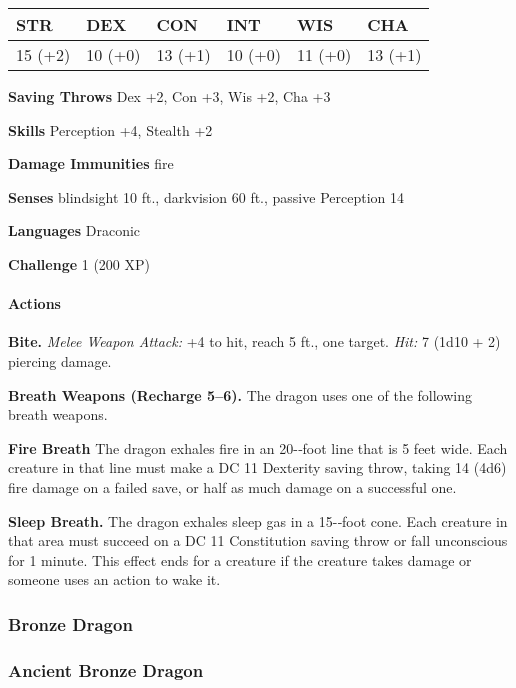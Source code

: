 \documentclass[
]{article}
\begin{document}
\begin{longtable}[]{@{}llllll@{}}
\toprule
STR & DEX & CON & INT & WIS & CHA\tabularnewline
\midrule
\endhead
15 (+2) & 10 (+0) & 13 (+1) & 10 (+0) & 11 (+0) & 13 (+1)\tabularnewline
\bottomrule
\end{longtable}

\textbf{Saving Throws} Dex +2, Con +3, Wis +2, Cha +3

\textbf{Skills} Perception +4, Stealth +2

\textbf{Damage Immunities} fire

\textbf{Senses} blindsight 10 ft., darkvision 60 ft., passive Perception
14

\textbf{Languages} Draconic

\textbf{Challenge} 1 (200 XP)

\hypertarget{actions-46}{%
\paragraph{Actions}\label{actions-46}}

\textbf{Bite.} \emph{Melee Weapon Attack:} +4 to hit, reach 5 ft., one
target. \emph{Hit:} 7 (1d10 + 2) piercing damage.

\textbf{Breath Weapons (Recharge 5--6).} The dragon uses one of the
following breath weapons.

\textbf{Fire Breath} The dragon exhales fire in an 20-­‐foot line that
is 5 feet wide. Each creature in that line must make a DC 11 Dexterity
saving throw, taking 14 (4d6) fire damage on a failed save, or half as
much damage on a successful one.

\textbf{Sleep Breath.} The dragon exhales sleep gas in a 15-­‐foot cone.
Each creature in that area must succeed on a DC 11 Constitution saving
throw or fall unconscious for 1 minute. This effect ends for a creature
if the creature takes damage or someone uses an action to wake it.

\hypertarget{bronze-dragon}{%
\subsubsection{Bronze Dragon}\label{bronze-dragon}}

\hypertarget{ancient-bronze-dragon}{%
\subsubsection{Ancient Bronze Dragon}\label{ancient-bronze-dragon}}
\end{document}
